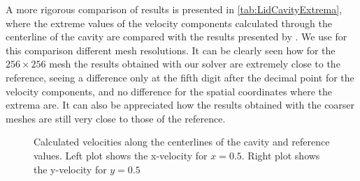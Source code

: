 A more rigorous comparison of results is presented in \cref{tab:LidCavityExtrema}, where the extreme values of the velocity components calculated through the centerline of the cavity are compared with the results presented by \cite{botellaBenchmarkSpectralResults1998}. We use for this comparison different mesh resolutions. It can be clearly seen how for the $256\times 256$ mesh the results obtained with our solver are extremely close to the reference, seeing a difference only at the fifth digit after the decimal point for the velocity components, and no difference for the spatial coordinates where the extrema are. It can also be appreciated how the results obtained with the coarser meshes are still very close to those of the reference.

\newpage
\begin{figure}[tb]
	\caption{Calculated velocities along the centerlines of the cavity and reference values. Left plot shows the x-velocity for $x = 0.5$. Right plot shows the y-velocity for $y = 0.5$  }
	\label{fig:LidVelocities}
\end{figure}

